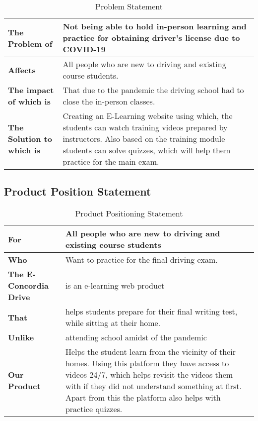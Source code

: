 \documentclass{article}
\begin{document}
\begin{table}[h!]
\begin{tabular}{|p{4.5cm}|p{11.5cm}|}
\hline
\textbf{The Problem of} & Not being able to hold in-person learning and practice for obtaining driver's license due to COVID-19 \\ \hline
\textbf{Affects} & All people who are new to driving and existing course students. \\ \hline
\textbf{The impact of which is} & That due to the pandemic the driving school had to close the in-person classes. \\ \hline
\textbf{The Solution to which is} & Creating an E-Learning website using which, the students can watch training videos prepared by instructors. Also based on the training module students can solve quizzes, which will help them practice for the main exam.\\ \hline
\end{tabular}
\caption{Problem Statement}
\label{table:1}
\end{table}

\subsection{Product Position Statement}

\begin{table}[h!]
\begin{tabular}{|p{4.5cm}|p{11.5cm}|}
\hline
\textbf{For} & All people who are new to driving and existing course students\\ \hline
\textbf{Who}& Want to practice for the final driving exam.\\ \hline
\textbf{The E-Concordia Drive} & is an e-learning web product\\ \hline
\textbf{That} & helps students prepare for their final writing test, while sitting at their home.\\ \hline
\textbf{Unlike} & attending school amidst of the pandemic \\ \hline
\textbf{Our Product} & Helps the student learn from the vicinity of their homes. Using this platform they have access to videos 24/7, which helps revisit the videos them with if they did not understand something at first. Apart from this the platform also helps with practice quizzes.\\ \hline
\end{tabular}
\caption{Product Positioning Statement}
\label{table:2}
\end{table}
\end{document}
